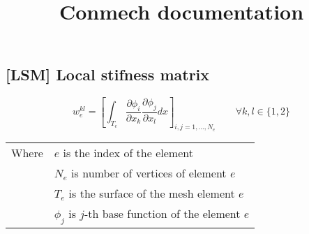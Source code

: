 \documentclass{article}
\title{Conmech documentation}
\begin{document}
\maketitle

\subsection*{[LSM] Local stifness matrix}

\[
w_e^{kl} = \left[
\int_{T_e} \frac{\partial \phi_i}{\partial x_k}\frac{\partial \phi_j}{\partial x_l}dx
\right]_{i,j=1, \dots, N_e} \qquad \forall k,l \in \{1, 2\}
\]

\begin{tabular}{ll}
Where & $e$ is the index of the element\\
& $N_e$ is number of vertices of element $e$\\
& $T_e$ is the surface of the mesh element $e$\\
& $\phi_j$ is $j$-th base function of the element $e$
\end{tabular}
\end{document}
